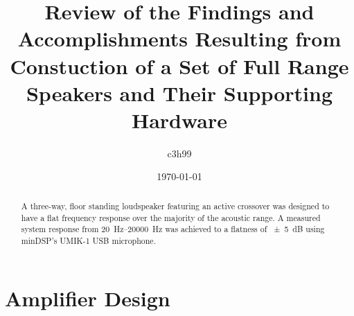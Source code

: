\documentclass{StdTemplate} %
\title{Review of the Findings and Accomplishments Resulting from Constuction of a Set of Full Range Speakers and Their Supporting Hardware}
\author{c3h99}
\date{\today}
\begin{document}
\TitlePage
%
\begin{abstract}
A three-way, floor standing loudspeaker featuring an active crossover was designed to have a flat frequency response over the majority of the acoustic range. A measured system response from \SIrange{20}{20000}{\hertz} was achieved to a flatness of \SI{\pm 5}{\dB} using minDSP’s UMIK-1 USB microphone.
\end{abstract}
%
%


%
\section{Amplifier Design}
%
\end{document}
